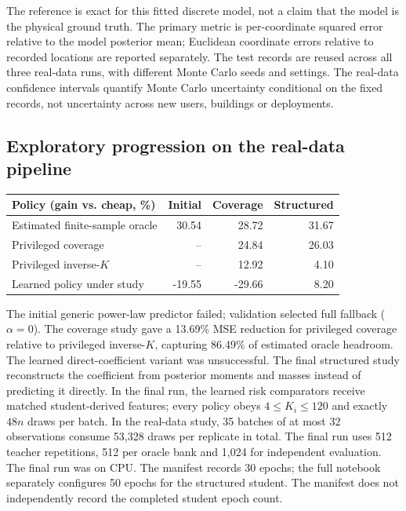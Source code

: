 \documentclass[10pt,letterpaper]{article}
\begin{document}
The reference is exact for this fitted discrete model, not a claim that the model is the physical ground truth. The primary metric is per-coordinate squared error relative to the model posterior mean; Euclidean coordinate errors relative to recorded locations are reported separately. The test records are reused across all three real-data runs, with different Monte Carlo seeds and settings. The real-data confidence intervals quantify Monte Carlo uncertainty conditional on the fixed records, not uncertainty across new users, buildings or deployments.
\subsection{Exploratory progression on the real-data pipeline}
\begin{center}\begin{minipage}{\linewidth}\centering\small
\begin{tabularx}{\linewidth}{@{}Yrrr@{}}\toprule
Policy (gain vs. cheap, \%) & Initial & Coverage & Structured\\\midrule
Estimated finite-sample oracle & 30.54 & 28.72 & 31.67\\
Privileged coverage & -- & 24.84 & 26.03\\
Privileged inverse-$K$ & -- & 12.92 & 4.10\\
Learned policy under study & -19.55 & -29.66 & 8.20\\
\bottomrule\end{tabularx}\end{minipage}\end{center}
The initial generic power-law predictor failed; validation selected full fallback ($\alpha=0$). The coverage study gave a 13.69\% MSE reduction for privileged coverage relative to privileged inverse-$K$, capturing 86.49\% of estimated oracle headroom. The learned direct-coefficient variant was unsuccessful. The final structured study reconstructs the coefficient from posterior moments and masses instead of predicting it directly. In the final run, the learned risk comparators receive matched student-derived features; every policy obeys $4\le K_i\le120$ and exactly $48n$ draws per batch. In the real-data study, 35 batches of at most 32 observations consume 53,328 draws per replicate in total. The final run uses 512 teacher repetitions, 512 per oracle bank and 1,024 for independent evaluation. The final run was on CPU. The manifest records 30 epochs; the full notebook separately configures 50 epochs for the structured student. The manifest does not independently record the completed student epoch count.
\end{document}

